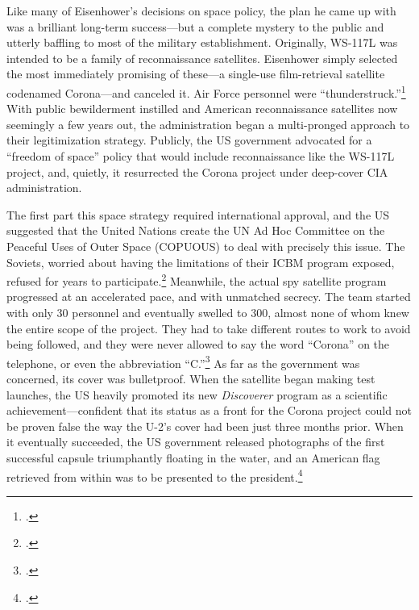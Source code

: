 \documentclass{report}
\begin{document}
Like many of Eisenhower's decisions on space policy, the plan he came up with was a brilliant long-term success---but a complete mystery to the public and utterly baffling to most of the military establishment. Originally, WS-117L was intended to be a family of reconnaissance satellites. Eisenhower simply selected the most immediately promising of these---a single-use film-retrieval satellite codenamed Corona---and canceled it. Air Force personnel were ``thunderstruck.''\footcite[p.~45]{peebles_corona_1997} With public bewilderment instilled and American reconnaissance satellites now seemingly a few years out, the administration began a multi-pronged approach to their legitimization strategy. Publicly, the US government advocated for a ``freedom of space'' policy that would include reconnaissance like the WS-117L project, and, quietly, it resurrected the Corona project under deep-cover CIA administration.

The first part this space strategy required international approval, and the US suggested that the United Nations create the UN Ad Hoc Committee on the Peaceful Uses of Outer Space (COPUOUS) to deal with precisely this issue. The Soviets, worried about having the limitations of their ICBM program exposed, refused for years to participate.\footcite[p.~140]{day_eye_2015} Meanwhile, the actual spy satellite program progressed at an accelerated pace, and with unmatched secrecy. The team started with only 30 personnel and eventually swelled to 300, almost none of whom knew the entire scope of the project. They had to take different routes to work to avoid being followed, and they were never allowed to say the word ``Corona'' on the telephone, or even the abbreviation ``C.''\footcite[p.~51]{peebles_shadow_2000} As far as the government was concerned, its cover was bulletproof. When the satellite began making test launches, the US heavily promoted its new \emph{Discoverer} program as a scientific achievement---confident that its status as a front for the Corona project could not be proven false the way the U-2's cover had been just three months prior. When it eventually succeeded, the US government released photographs of the first successful capsule triumphantly floating in the water, and an American flag retrieved from within was to be presented to the president.\footcite[p.~83]{peebles_shadow_2000}
\end{document}
